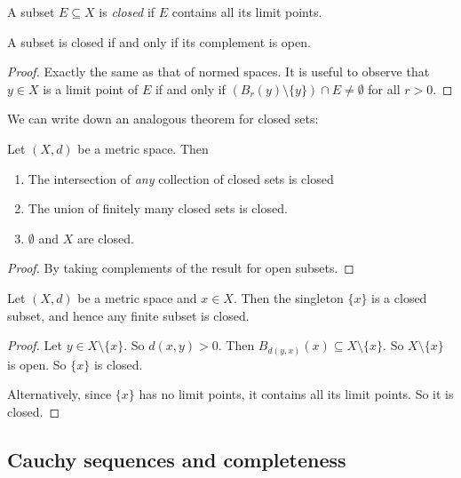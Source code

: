 \documentclass[a4paper]{article}
\begin{document}
\begin{defi}
  A subset $E\subseteq X$ is \emph{closed} if $E$ contains all its limit points.
\end{defi}

\begin{prop}
  A subset is closed if and only if its complement is open.
\end{prop}

\begin{proof}
  Exactly the same as that of normed spaces. It is useful to observe that $y \in X$ is a limit point of $E$ if and only if $(B_r(y)\setminus \{y\}) \cap E \not= \emptyset$ for all $r > 0$.
\end{proof}

We can write down an analogous theorem for closed sets:
\begin{thm}
  Let $(X, d)$ be a metric space. Then
  \begin{enumerate}
    \item The intersection of \emph{any} collection of closed sets is closed
    \item The union of finitely many closed sets is closed.
    \item $\emptyset$ and $X$ are closed.
  \end{enumerate}
\end{thm}

\begin{proof}
  By taking complements of the result for open subsets.
\end{proof}

\begin{prop}
  Let $(X, d)$ be a metric space and $x \in X$. Then the singleton $\{x\}$ is a closed subset, and hence any finite subset is closed.
\end{prop}

\begin{proof}
  Let $y \in X \setminus \{x\}$. So $d(x, y) > 0$. Then $B_{d(y, x)}(x) \subseteq X\setminus \{x\}$. So $X\setminus \{x\}$ is open. So $\{x\}$ is closed.

  Alternatively, since $\{x\}$ has no limit points, it contains all its limit points. So it is closed.
\end{proof}

\subsection{Cauchy sequences and completeness}
\end{document}
